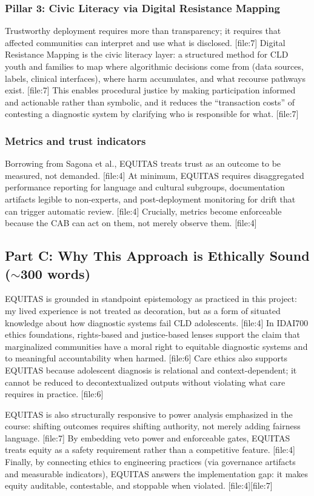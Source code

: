 \documentclass[12pt]{article}
\begin{document}
\subsubsection*{Pillar 3: Civic Literacy via Digital Resistance Mapping}
Trustworthy deployment requires more than transparency; it requires that affected communities can interpret and use what is disclosed. [file:7]
Digital Resistance Mapping is the civic literacy layer: a structured method for CLD youth and families to map where algorithmic decisions come from (data sources, labels, clinical interfaces), where harm accumulates, and what recourse pathways exist. [file:7]
This enables procedural justice by making participation informed and actionable rather than symbolic, and it reduces the ``transaction costs'' of contesting a diagnostic system by clarifying who is responsible for what. [file:7]

\subsubsection*{Metrics and trust indicators}
Borrowing from Sagona et al., EQUITAS treats trust as an outcome to be measured, not demanded. [file:4]
At minimum, EQUITAS requires disaggregated performance reporting for language and cultural subgroups, documentation artifacts legible to non-experts, and post-deployment monitoring for drift that can trigger automatic review. [file:4]
Crucially, metrics become enforceable because the CAB can act on them, not merely observe them. [file:4]

\subsection{Part C: Why This Approach is Ethically Sound (\texorpdfstring{$\sim$}{\textasciitilde}300 words)}
EQUITAS is grounded in standpoint epistemology as practiced in this project: my lived experience is not treated as decoration, but as a form of situated knowledge about how diagnostic systems fail CLD adolescents. [file:4]
In IDAI700 ethics foundations, rights-based and justice-based lenses support the claim that marginalized communities have a moral right to equitable diagnostic systems and to meaningful accountability when harmed. [file:6]
Care ethics also supports EQUITAS because adolescent diagnosis is relational and context-dependent; it cannot be reduced to decontextualized outputs without violating what care requires in practice. [file:6]

EQUITAS is also structurally responsive to power analysis emphasized in the course: shifting outcomes requires shifting authority, not merely adding fairness language. [file:7]
By embedding veto power and enforceable gates, EQUITAS treats equity as a safety requirement rather than a competitive feature. [file:4]
Finally, by connecting ethics to engineering practices (via governance artifacts and measurable indicators), EQUITAS answers the implementation gap: it makes equity auditable, contestable, and stoppable when violated. [file:4][file:7]
\end{document}
